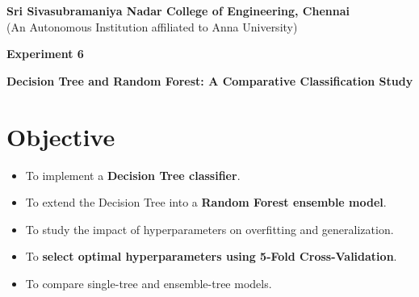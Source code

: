 \documentclass[11pt]{article}
\begin{document}
\begin{center}
    \Large \textbf{Sri Sivasubramaniya Nadar College of Engineering, Chennai} \\
    \large (An Autonomous Institution affiliated to Anna University) \\
    \vspace{0.3cm}
\end{center}

\begin{table}[h!]
\renewcommand{\arraystretch}{1.5}
\centering
{}
\end{table}

\begin{center}
    \textbf{\Large Experiment 6}
\end{center}

\begin{center}
    \textbf{Decision Tree and Random Forest: A Comparative Classification Study}
\end{center}


\section*{Objective}
\begin{itemize}
    \item To implement a \textbf{Decision Tree classifier}.
    \item To extend the Decision Tree into a \textbf{Random Forest ensemble model}.
    \item To study the impact of hyperparameters on overfitting and generalization.
    \item To \textbf{select optimal hyperparameters using 5-Fold Cross-Validation}.
    \item To compare single-tree and ensemble-tree models.
\end{itemize}
\end{document}
